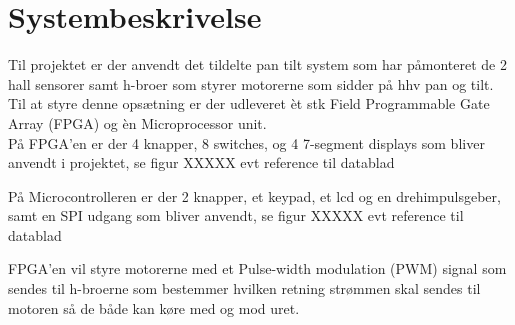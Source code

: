 \section{Systembeskrivelse}
Til projektet er der anvendt det tildelte pan tilt system som har påmonteret de 2 hall sensorer samt h-broer som styrer motorerne som sidder på hhv pan og tilt.\\
Til at styre denne opsætning er der udleveret èt stk Field Programmable Gate Array (FPGA) og èn Microprocessor unit.\\

På FPGA'en er der 4 knapper, 8 switches, og 4 7-segment displays som bliver anvendt i projektet, se figur XXXXX evt reference til datablad

På Microcontrolleren er der 2 knapper, et keypad, et lcd og en drehimpulsgeber, samt en SPI udgang som bliver anvendt, se figur XXXXX evt reference til datablad

FPGA'en vil styre motorerne med et Pulse-width modulation (PWM) signal som sendes til h-broerne som bestemmer hvilken retning strømmen skal sendes til motoren så de både kan køre med og mod uret.